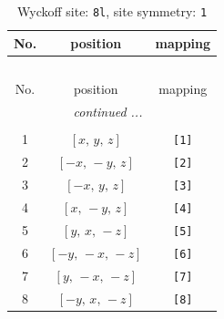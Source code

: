 \documentclass[fleqn,8pt]{jsarticle}
\begin{document}
\renewcommand{\arraystretch}{1.2}
\begin{longtable}{ccc}
\caption{Wyckoff site: {\tt 8l}, site symmetry: {\tt 1}}
 \\
 \hline \hline
No. & position & mapping \\ \hline \endfirsthead

\multicolumn{2}{l}{\tablename\ \thetable{}} \\
 \hline \hline
No. & position & mapping \\ \hline \endhead

 \hline \hline
\multicolumn{2}{r}{\footnotesize\it continued ...} \\ \endfoot

 \hline \hline
\multicolumn{2}{r}{} \\ \endlastfoot

1 & $\left[ x,\, y,\, z \right]$ & {\tt [1]} \\ \hline
2 & $\left[ - x,\, - y,\, z \right]$ & {\tt [2]} \\ \hline
3 & $\left[ - x,\, y,\, z \right]$ & {\tt [3]} \\ \hline
4 & $\left[ x,\, - y,\, z \right]$ & {\tt [4]} \\ \hline
5 & $\left[ y,\, x,\, - z \right]$ & {\tt [5]} \\ \hline
6 & $\left[ - y,\, - x,\, - z \right]$ & {\tt [6]} \\ \hline
7 & $\left[ y,\, - x,\, - z \right]$ & {\tt [7]} \\ \hline
8 & $\left[ - y,\, x,\, - z \right]$ & {\tt [8]} \\
\end{longtable}
\end{document}

